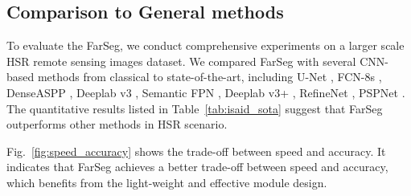 \documentclass[10pt,twocolumn,letterpaper]{article}
\begin{document}
\subsection{Comparison to General methods}
To evaluate the FarSeg, we conduct comprehensive experiments on a larger scale HSR remote sensing images dataset.
We compared FarSeg with several CNN-based methods from classical to state-of-the-art, including U-Net \cite{ronneberger2015u}, FCN-8s \cite{long2015fully}, DenseASPP \cite{yang2018denseaspp}, Deeplab v3 \cite{chen2017rethinking}, Semantic FPN \cite{kirillov2019panoptic}, Deeplab v3+ \cite{chen2018encoder}, RefineNet \cite{lin2017refinenet}, PSPNet \cite{zhao2017pyramid}.
The quantitative results listed in Table~\ref{tab:isaid_sota} suggest that FarSeg outperforms other methods in HSR scenario.

Fig.~\ref{fig:speed_accuracy} shows the trade-off between speed and accuracy.
It indicates that FarSeg achieves a better trade-off between speed and accuracy, which benefits from the light-weight and effective module design.
\end{document}
